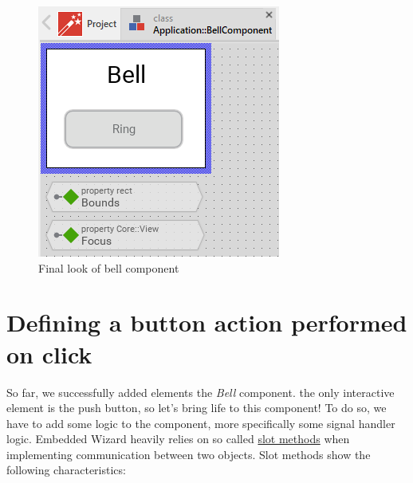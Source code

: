 \documentclass[
  a4paper,
,tablecaptionabove
]{scrbook}
\begin{document}
\begin{figure}
\centering
\includegraphics{./../asciidoc/modules/ROOT/assets/images/firstcomponent/BellComponentFinal.png}
\caption{Final look of bell component}
\end{figure}

\hypertarget{_defining_a_button_action_performed_on_click}{%
\section{Defining a button action performed on
click}\label{_defining_a_button_action_performed_on_click}}

So far, we successfully added elements the \emph{Bell} component. the
only interactive element is the push button, so let's bring life to this
component! To do so, we have to add some logic to the component, more
specifically some signal handler logic. Embedded Wizard heavily relies
on so called
\href{https://doc.embedded-wizard.de/slot-method-member}{slot methods}
when implementing communication between two objects. Slot methods show
the following characteristics:
\end{document}
